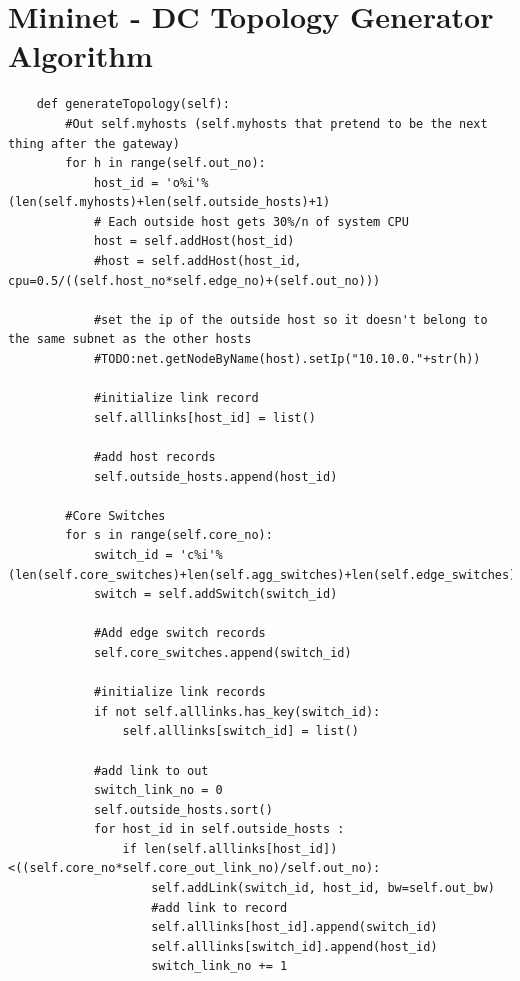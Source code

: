 \documentclass[12pt,english,oneside]{book}
\begin{document}
\chapter{Mininet - DC Topology Generator Algorithm}
\label{app:tpalg}


\begin{lstlisting}
    def generateTopology(self):
        #Out self.myhosts (self.myhosts that pretend to be the next thing after the gateway)
        for h in range(self.out_no):
            host_id = 'o%i'% (len(self.myhosts)+len(self.outside_hosts)+1)
            # Each outside host gets 30%/n of system CPU
            host = self.addHost(host_id)
            #host = self.addHost(host_id, cpu=0.5/((self.host_no*self.edge_no)+(self.out_no)))
            
            #set the ip of the outside host so it doesn't belong to the same subnet as the other hosts
            #TODO:net.getNodeByName(host).setIp("10.10.0."+str(h))

            #initialize link record
            self.alllinks[host_id] = list()
            
            #add host records
            self.outside_hosts.append(host_id)
                
        #Core Switches
        for s in range(self.core_no):
            switch_id = 'c%i'%(len(self.core_switches)+len(self.agg_switches)+len(self.edge_switches)+1)
            switch = self.addSwitch(switch_id)
            
            #Add edge switch records
            self.core_switches.append(switch_id)
            
            #initialize link records
            if not self.alllinks.has_key(switch_id):
                self.alllinks[switch_id] = list()
            
            #add link to out
            switch_link_no = 0
            self.outside_hosts.sort()
            for host_id in self.outside_hosts :
                if len(self.alllinks[host_id])<((self.core_no*self.core_out_link_no)/self.out_no):
                    self.addLink(switch_id, host_id, bw=self.out_bw)
                    #add link to record
                    self.alllinks[host_id].append(switch_id)
                    self.alllinks[switch_id].append(host_id)
                    switch_link_no += 1
                    

\end{lstlisting}
\end{document}
